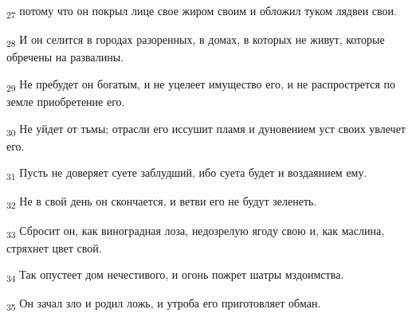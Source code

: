 \begin{tcolorbox}
\textsubscript{27} потому что он покрыл лице свое жиром своим и обложил туком лядвеи свои.
\end{tcolorbox}
\begin{tcolorbox}
\textsubscript{28} И он селится в городах разоренных, в домах, в которых не живут, которые обречены на развалины.
\end{tcolorbox}
\begin{tcolorbox}
\textsubscript{29} Не пребудет он богатым, и не уцелеет имущество его, и не распрострется по земле приобретение его.
\end{tcolorbox}
\begin{tcolorbox}
\textsubscript{30} Не уйдет от тьмы; отрасли его иссушит пламя и дуновением уст своих увлечет его.
\end{tcolorbox}
\begin{tcolorbox}
\textsubscript{31} Пусть не доверяет суете заблудший, ибо суета будет и воздаянием ему.
\end{tcolorbox}
\begin{tcolorbox}
\textsubscript{32} Не в свой день он скончается, и ветви его не будут зеленеть.
\end{tcolorbox}
\begin{tcolorbox}
\textsubscript{33} Сбросит он, как виноградная лоза, недозрелую ягоду свою и, как маслина, стряхнет цвет свой.
\end{tcolorbox}
\begin{tcolorbox}
\textsubscript{34} Так опустеет дом нечестивого, и огонь пожрет шатры мздоимства.
\end{tcolorbox}
\begin{tcolorbox}
\textsubscript{35} Он зачал зло и родил ложь, и утроба его приготовляет обман.
\end{tcolorbox}

